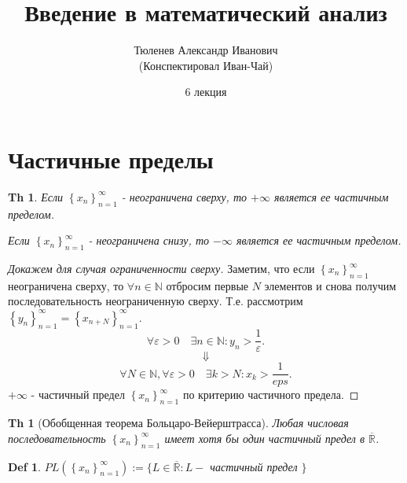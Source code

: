 \documentclass[a5paper, 10pt]{article}
\theoremstyle{plain}
\newtheorem{theorem}{Th}
\newtheorem*{theorem_}{Th}
\newtheorem{definition}{Def}
\newcommand{\N}{\mathbb N}
\newcommand{\eps}{\varepsilon}
\newcommand{\oR}{\overline{\mathbb R}}
\begin{document}
	\author{Тюленев Александр Иванович\\(Конспектировал Иван-Чай)}
	\date{6 лекция}
	\title{Введение в математический анализ}

	\linespread{1.4}
	\selectfont

	\maketitle
	\newpage

	\tableofcontents

    \section{Частичные пределы}

    \begin{theorem}
        Если $ \left\{x_n \right\}_{n = 1}^{\infty} $ - неограничена сверху, то
        $ + \infty $ является ее частичным пределом.

        Если $ \left\{x_n \right\}_{n = 1}^{\infty} $ - неограничена снизу, то
        $ - \infty $ является ее частичным пределом.
    \end{theorem}

    \begin{proof}[Докажем для случая ограниченности сверху]
        Заметим, что если $ \left\{x_n \right\}_{n = 1}^{\infty} $ неограничена сверху, то
        $ \forall n \in \N $ отбросим первые $ N $ элементов и снова получим последовательность
        неограниченную сверху. Т.е. рассмотрим $ \left\{y_n \right\}_{n = 1}^{\infty} =
        \left\{ x_{n + N} \right\}_{n = 1}^{\infty} $.
        \[
            \forall \eps > 0 \quad \exists n \in \N: y_n > \frac{1}{\eps}
        .\] \[ \Downarrow \] \[
            \forall N \in \N, \forall \eps > 0 \quad \exists k > N: x_k > \frac{1}{eps}
        .\]
        $ +\infty $ - частичный предел $ \left\{x_n \right\}_{n = 1}^{\infty} $ по критерию частичного предела.
    \end{proof}

    \begin{theorem_}[Обобщенная теорема Больцаро-Вейерштрасса]
        Любая числовая последовательность $ \left\{x_n \right\}_{n = 1}^{\infty} $
        имеет хотя бы один частичный предел в $ \oR $.
    \end{theorem_}

    \begin{definition}
        $ PL\left( \left\{x_n \right\}_{n = 1}^{\infty} \right) := \{ L \in \oR: L - $ частичный предел $ \} $
    \end{definition}
\end{document}
